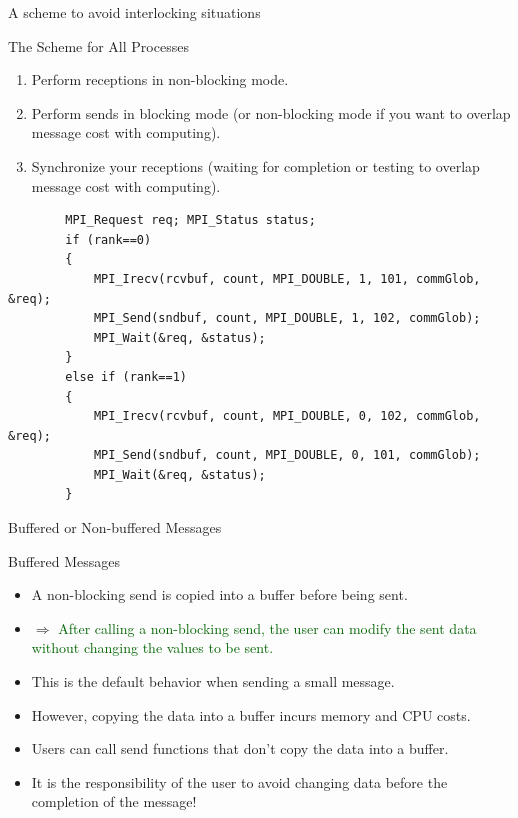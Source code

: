 \documentclass[compress,10pt,aspectratio=169]{beamer}
\begin{document}
\begin{frame}[fragile]{A scheme to avoid interlocking situations}
    \scriptsize
    \begin{block}{The Scheme for All Processes}
        \begin{enumerate}
            \item Perform receptions in non-blocking mode.
            \item Perform sends in blocking mode (or non-blocking mode if you want to overlap message cost with computing).
            \item Synchronize your receptions (waiting for completion or testing to overlap message cost with computing).
        \end{enumerate}
    \end{block}
    \begin{verbatim}
        MPI_Request req; MPI_Status status;
        if (rank==0)
        {
            MPI_Irecv(rcvbuf, count, MPI_DOUBLE, 1, 101, commGlob, &req);
            MPI_Send(sndbuf, count, MPI_DOUBLE, 1, 102, commGlob);
            MPI_Wait(&req, &status);
        }
        else if (rank==1)
        {
            MPI_Irecv(rcvbuf, count, MPI_DOUBLE, 0, 102, commGlob, &req);
            MPI_Send(sndbuf, count, MPI_DOUBLE, 0, 101, commGlob);
            MPI_Wait(&req, &status);
        }
        \end{verbatim}
\end{frame}


\begin{frame}[fragile]{Buffered or Non-buffered Messages}

    \begin{block}{Buffered Messages}
        \begin{itemize}
            \item A non-blocking send is copied into a buffer before being sent.
            \item $\Rightarrow$ \textcolor{DarkGreen}{After calling a non-blocking send, the user can modify the sent data without
                  changing the values to be sent.}
            \item This is the default behavior when sending a small message.
            \item However, copying the data into a buffer incurs memory and CPU costs.
            \item Users can call send functions that don't copy the data into a buffer.
            \item \alert{It is the responsibility of the user to avoid changing data before the completion of the message!}
        \end{itemize}
    \end{block}
\end{frame}
\end{document}
